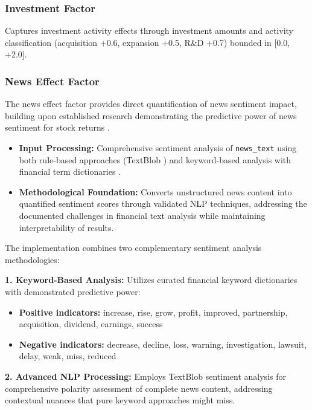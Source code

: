 \documentclass[3p,times,procedia]{elsarticle}
\begin{document}
\subsubsection{{Investment Factor}}

Captures investment activity effects \cite{Daniel1998} through investment amounts and activity classification (acquisition +0.6, expansion +0.5, R\&D +0.7) bounded in [0.0, +2.0].

\subsubsection{{News Effect Factor}}

The news effect factor provides direct quantification of news sentiment impact, building upon established research demonstrating the predictive power of news sentiment for stock returns \cite{TETLOCK2007,Schumaker2009}.

\begin{itemize}
    \item \textbf{Input Processing:} Comprehensive sentiment analysis of \texttt{news\_text} using both rule-based approaches (TextBlob \cite{Loria2019}) and keyword-based analysis with financial term dictionaries \cite{Loughran2011}.
    \item \textbf{Methodological Foundation:} Converts unstructured news content into quantified sentiment scores through validated NLP techniques, addressing the documented challenges in financial text analysis while maintaining interpretability of results.
\end{itemize}

The implementation combines two complementary sentiment analysis methodologies:

\textbf{1. Keyword-Based Analysis:} Utilizes curated financial keyword dictionaries with demonstrated predictive power:
\begin{itemize}
\item \textbf{Positive indicators:} increase, rise, grow, profit, improved, partnership, acquisition, dividend, earnings, success
\item \textbf{Negative indicators:} decrease, decline, loss, warning, investigation, lawsuit, delay, weak, miss, reduced
\end{itemize}

\textbf{2. Advanced NLP Processing:} Employs TextBlob \cite{Loria2019} sentiment analysis for comprehensive polarity assessment of complete news content, addressing contextual nuances that pure keyword approaches might miss.
\end{document}
